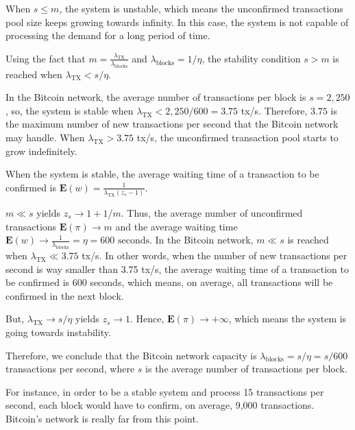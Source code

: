 When $s \le m$, the system is unstable, which means the unconfirmed transactions pool size keeps growing towards infinity. In this case, the system is not capable of processing the demand for a long period of time.

Using the fact that $m=\frac{\lambda_{\text{TX}}}{\lambda_{\text{blocks}}}$ and $\lambda_{\text{blocks}} = 1/\eta$, the stability condition $s > m$ is reached when $\lambda_{\text{TX}} < s/\eta$.

In the Bitcoin network, the average number of transactions per block is $s=2,250$, so, the system is stable when $\lambda_{\text{TX}} < 2,250/600 = 3.75$ tx/s. Therefore, $3.75$ is the maximum number of new transactions per second that the Bitcoin network may handle. When $\lambda_{\text{TX}} > 3.75$ tx/s, the unconfirmed transaction pool starts to grow indefinitely.

When the system is stable, the average waiting time of a transaction to be confirmed is $\mathbf{E}(w) = \frac{1}{\lambda_{\text{TX}} (z_s-1)}$.

$m \ll s$ yields $z_s \rightarrow 1 + 1/m$. Thus, the average number of unconfirmed transactions $\mathbf{E}(\pi) \rightarrow m$ and the average waiting time $\mathbf{E}(w) \rightarrow \frac{1}{\lambda_{\text{blocks}}} = \eta = 600 \text{ seconds}$. In the Bitcoin network, $m \ll s$ is reached when $\lambda_{\text{TX}} \ll 3.75$ tx/s. In other words, when the number of new transactions per second is way smaller than 3.75 tx/s, the average waiting time of a transaction to be confirmed is 600 seconds, which means, on average, all transactions will be confirmed in the next block.

But, $\lambda_{\text{TX}} \rightarrow s/\eta$ yields $z_s \rightarrow 1$. Hence, $\mathbf{E}(\pi) \rightarrow +\infty$, which means the system is going towards instability.

Therefore, we conclude that the Bitcoin network capacity is $\lambda_{\text{blocks}} = s/\eta = s/600$ transactions per second, where $s$ is the average number of transactions per block.

For instance, in order to be a stable system and process 15 transactions per second, each block would have to confirm, on average, 9,000 transactions. Bitcoin's network is really far from this point.



